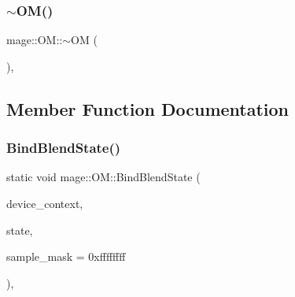 \hypertarget{structmage_1_1_o_m_a2d416d2c21400b191d3abb36f6bb4c97}{}\label{structmage_1_1_o_m_a2d416d2c21400b191d3abb36f6bb4c97} 
\subsubsection{\texorpdfstring{$\sim$\+O\+M()}{~OM()}}
{\footnotesize\ttfamily mage\+::\+O\+M\+::$\sim$\+OM (\begin{DoxyParamCaption}{ }\end{DoxyParamCaption})\hspace{0.3cm}{\ttfamily [private]}, {\ttfamily [delete]}}



\subsection{Member Function Documentation}
\hypertarget{structmage_1_1_o_m_aa0ab164522c95b983254718a17f8304e}{}\label{structmage_1_1_o_m_aa0ab164522c95b983254718a17f8304e} 
\subsubsection{\texorpdfstring{Bind\+Blend\+State()}{BindBlendState()}\hspace{0.1cm}{\footnotesize\ttfamily [1/2]}}
{\footnotesize\ttfamily static void mage\+::\+O\+M\+::\+Bind\+Blend\+State (\begin{DoxyParamCaption}\item[{I\+D3\+D11\+Device\+Context2 $\ast$}]{device\+\_\+context,  }\item[{I\+D3\+D11\+Blend\+State $\ast$}]{state,  }\item[{U\+I\+NT}]{sample\+\_\+mask = {\ttfamily 0xffffffff} }\end{DoxyParamCaption})\hspace{0.3cm}{\ttfamily [static]}, {\ttfamily [noexcept]}}

\hypertarget{structmage_1_1_o_m_a1d28a8b67f3760107cfc4e8ae7fe78fa}{}\label{structmage_1_1_o_m_a1d28a8b67f3760107cfc4e8ae7fe78fa} 
